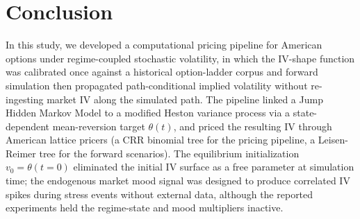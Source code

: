 \section{Conclusion}\label{sec:conclusion}

In this study, we developed a computational pricing pipeline for American options under regime-coupled stochastic volatility, in which the IV-shape function was calibrated once against a historical option-ladder corpus and forward simulation then propagated path-conditional implied volatility without re-ingesting market IV along the simulated path. The pipeline linked a Jump Hidden Markov Model to a modified Heston variance process via a state-dependent mean-reversion target $\theta(t)$, and priced the resulting IV through American lattice pricers (a CRR binomial tree for the pricing pipeline, a Leisen-Reimer tree for the forward scenarios). The equilibrium initialization $v_0 = \theta(t\!=\!0)$ eliminated the initial IV surface as a free parameter at simulation time; the endogenous market mood signal was designed to produce correlated IV spikes during stress events without external data, although the reported experiments held the regime-state and mood multipliers inactive.

